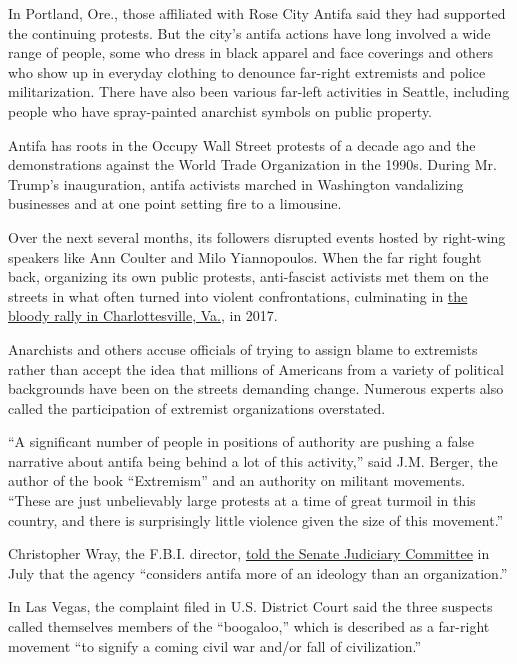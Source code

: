 In Portland, Ore., those affiliated with Rose City Antifa said they had
supported the continuing protests. But the city's antifa actions have
long involved a wide range of people, some who dress in black apparel
and face coverings and others who show up in everyday clothing to
denounce far-right extremists and police militarization. There have also
been various far-left activities in Seattle, including people who have
spray-painted anarchist symbols on public property.

Antifa has roots in the Occupy Wall Street protests of a decade ago and
the demonstrations against the World Trade Organization in the 1990s.
During Mr. Trump's inauguration, antifa activists marched in Washington
vandalizing businesses and at one point setting fire to a limousine.

Over the next several months, its followers disrupted events hosted by
right-wing speakers like Ann Coulter and Milo Yiannopoulos. When the far
right fought back, organizing its own public protests, anti-fascist
activists met them on the streets in what often turned into violent
confrontations, culminating in
\href{https://www.nytimes3xbfgragh.onion/2017/08/12/us/charlottesville-protest-white-nationalist.html}{the
bloody rally in Charlottesville, Va.}, in 2017.

Anarchists and others accuse officials of trying to assign blame to
extremists rather than accept the idea that millions of Americans from a
variety of political backgrounds have been on the streets demanding
change. Numerous experts also called the participation of extremist
organizations overstated.

``A significant number of people in positions of authority are pushing a
false narrative about antifa being behind a lot of this activity,'' said
J.M. Berger, the author of the book ``Extremism'' and an authority on
militant movements. ``These are just unbelievably large protests at a
time of great turmoil in this country, and there is surprisingly little
violence given the size of this movement.''

Christopher Wray, the F.B.I. director,
\href{https://reason.com/2019/07/24/ted-cruz-wants-antifa-investigated-by-the-fbi/}{told
the Senate Judiciary Committee} in July that the agency ``considers
antifa more of an ideology than an organization.''

In Las Vegas, the complaint filed in U.S. District Court said the three
suspects called themselves members of the ``boogaloo,'' which is
described as a far-right movement ``to signify a coming civil war and/or
fall of civilization.''

